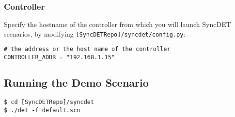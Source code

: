 \subsubsection{Controller} 
Specify the hostname of the controller from which you will launch
SyncDET scenarios, by modifying {\tt [SyncDETRepo]/syncdet/config.py}:
\begin{verbatim}
# the address or the host name of the controller
CONTROLLER_ADDR = "192.168.1.15"
\end{verbatim}

\subsection{Running the Demo Scenario}
\begin{verbatim}
$ cd [SyncDETRepo]/syncdet
$ ./det -f default.scn
\end{verbatim}

